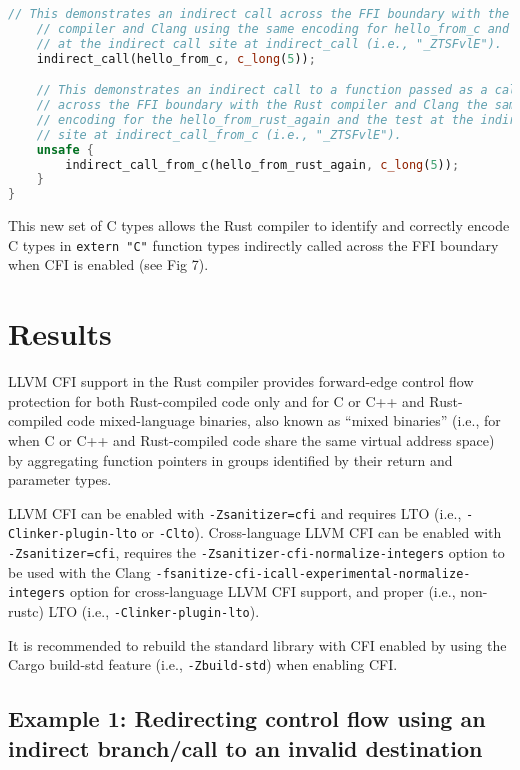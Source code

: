 \documentclass{article}
\begin{document}
\begin{lstlisting}[language=Rust, caption={Example Rust program using Rust integer types and the Rust compiler encoding with the cfi\_types crate types.}]
    // This demonstrates an indirect call across the FFI boundary with the Rust
    // compiler and Clang using the same encoding for hello_from_c and the test
    // at the indirect call site at indirect_call (i.e., "_ZTSFvlE").
    indirect_call(hello_from_c, c_long(5));

    // This demonstrates an indirect call to a function passed as a callback
    // across the FFI boundary with the Rust compiler and Clang the same
    // encoding for the hello_from_rust_again and the test at the indirect call
    // site at indirect_call_from_c (i.e., "_ZTSFvlE").
    unsafe {
        indirect_call_from_c(hello_from_rust_again, c_long(5));
    }
}
\end{lstlisting}

This new set of C types allows the Rust compiler to identify and correctly encode C types in \texttt{extern "C"} function types indirectly called across the FFI boundary when CFI is enabled (see Fig 7).


\section{Results}

LLVM CFI support in the Rust compiler provides forward-edge control flow protection for both Rust-compiled code only and for C or C++ and Rust-compiled code mixed-language binaries, also known as “mixed binaries” (i.e., for when C or C++ and Rust-compiled code share the same virtual address space) by aggregating function pointers in groups identified by their return and parameter types.

LLVM CFI can be enabled with \texttt{-Zsanitizer=cfi} and requires LTO (i.e., \texttt{-Clinker-plugin-lto} or \texttt{-Clto}). Cross-language LLVM CFI can be enabled with \texttt{-Zsanitizer=cfi}, requires the \texttt{-Zsanitizer-cfi-normalize-integers} option to be used with the Clang \texttt{-fsanitize-cfi-icall-experimental-normalize-integers} option for cross-language LLVM CFI support, and proper (i.e., non-rustc) LTO (i.e., \texttt{-Clinker-plugin-lto}).

It is recommended to rebuild the standard library with CFI enabled by using the Cargo build-std feature (i.e., \texttt{-Zbuild-std}) when enabling CFI.


\subsection{Example 1: Redirecting control flow using an indirect branch/call to an invalid destination}
\end{document}
